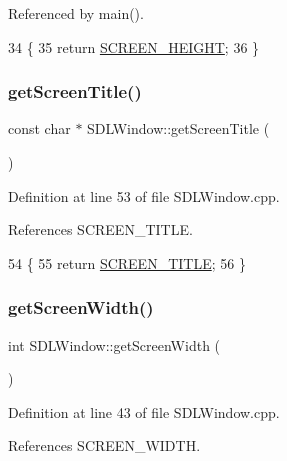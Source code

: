 Referenced by main().


\begin{DoxyCode}
34 \{
35     \textcolor{keywordflow}{return} \hyperlink{class_s_d_l_window_aed36cc4e541ecf78cda7e92f99a84d71}{SCREEN\_HEIGHT};
36 \}
\end{DoxyCode}
\mbox{\label{class_s_d_l_window_a7a21e853e2875a2a2324a59eefd04057}} 
\subsubsection{\texorpdfstring{get\+Screen\+Title()}{getScreenTitle()}}
{\footnotesize\ttfamily const char $\ast$ S\+D\+L\+Window\+::get\+Screen\+Title (\begin{DoxyParamCaption}{ }\end{DoxyParamCaption})}



Definition at line 53 of file S\+D\+L\+Window.\+cpp.



References S\+C\+R\+E\+E\+N\+\_\+\+T\+I\+T\+LE.


\begin{DoxyCode}
54 \{
55     \textcolor{keywordflow}{return} \hyperlink{class_s_d_l_window_afeb1a7d48dde026d437babea6667ebee}{SCREEN\_TITLE};
56 \}
\end{DoxyCode}
\mbox{\label{class_s_d_l_window_ad9bd55d793deb62b26932c5e1b8c1042}} 
\subsubsection{\texorpdfstring{get\+Screen\+Width()}{getScreenWidth()}}
{\footnotesize\ttfamily int S\+D\+L\+Window\+::get\+Screen\+Width (\begin{DoxyParamCaption}{ }\end{DoxyParamCaption})}



Definition at line 43 of file S\+D\+L\+Window.\+cpp.



References S\+C\+R\+E\+E\+N\+\_\+\+W\+I\+D\+TH.



